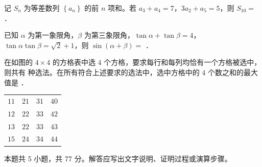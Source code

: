 \begin{question}
记 $S_n$ 为等差数列 $\left\{a_n\right\}$ 的前 $n$ 项和。若 $a_3+a_4=7$，$3a_2+a_5=5$，则 $S_{10}=$ \gkblank{}．

\end{question}
\begin{question}
已知 $\alpha$ 为第一象限角，$\beta$ 为第三象限角，$\tan\alpha+\tan\beta=4$，$\tan\alpha\tan\beta=\sqrt2+1$，则 $\sin(\alpha+\beta)=$ \gkblank{}．

\end{question}
\begin{question}
在如图的 $4\times4$ 的方格表中选 $4$ 个方格，要求每行和每列均恰有一个方格被选中，则共有 \gkblank{} 种选法。在所有符合上述要求的选法中，选中方格中的 $4$ 个数之和的最大值是 \gkblank{}．

\begin{center}
\begin{tabular}{cccc}
\toprule
 &  &  &  \\
\midrule
$11$ & $21$ & $31$ & $40$ \\
$12$ & $22$ & $33$ & $42$ \\
$13$ & $22$ & $33$ & $43$ \\
$15$ & $24$ & $34$ & $44$ \\
\bottomrule
\end{tabular}
\end{center}

\par\medskip

\end{question}

\begin{gktip}
本题共 5 小题，共 77 分。解答应写出文字说明、证明过程或演算步骤。
\end{gktip}

